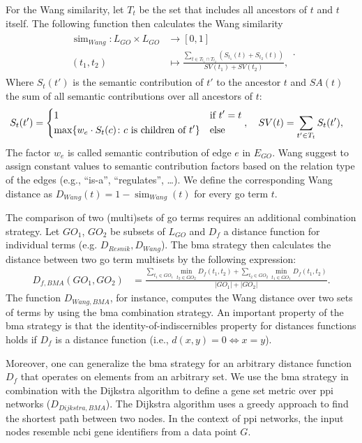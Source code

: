 \documentclass{thesisclass}
\DeclareMathOperator{\simOp}{sim}
\begin{document}
For the Wang similarity, let $T_t$ be the set that includes all ancestors of $t$ and $t$ itself. The following function then calculates the Wang similarity
\begin{align*}
	\begin{split}
		\simOp_{Wang} : L_{GO} \times L_{GO} & \to[0,1]\\
		(t_1, t_2) & \mapsto \frac{\displaystyle \sum_{t\in T_{t_1} \cap T_{t_2}} \left(S_{t_1}(t)+ S_{t_2}(t) \right) }{SV(t_1)+SV(t_2)},
	\end{split}.
\end{align*} 
Where $S_t(t')$ is the semantic contribution of $t'$ to the ancestor $t$ and $SA(t)$ the sum of all semantic contributions over all ancestors of $t$:
\begin{align*}
	S_t(t') & = \begin{dcases}
			1   & \text{if } t' = t \\
			\max \lbrace w_e \cdot S_t(c)\colon c \text{ is children of } t' \rbrace & \text{else}
	\end{dcases}, \quad SV(t) = \sum_{t' \in T_t} S_t(t'),
\end{align*}
The factor $w_e$ is called semantic contribution of edge $e$ in $E_{GO}$. Wang suggest to assign constant values to semantic contribution factors based on the relation type of the edges (e.g., ``is-a'', ``regulates'', \ldots).
We define the corresponding Wang distance as $D_{Wang}(t) = 1- \simOp_{Wang}(t)$ for every \acrfull{go} term $t$.

The comparison of two (multi)sets of \acrshort{go} terms requires an additional combination strategy. 
Let $GO_1$, $GO_2$ be subsets of $ L_{GO}$ and $D_f$ a distance function for individual terms (e.g. $D_{Resnik}, D_{Wang}$). 
The  \acrshort{bma} strategy then calculates the distance between two \acrfull{go} term multisets by the following expression:
\begin{align*}
		D_{f,BMA}(GO_1, GO_2) & =  \frac{\displaystyle \sum_{t_1\in GO_1} \min_{t_2 \in GO_2} D_f(t_1,t_2) +  \sum_{t_2 \in GO_2} \min_{t_1 \in GO_1} D_f(t_1,t_2)}{|GO_1| + |GO_2|}.
\end{align*}
The function $D_{Wang,BMA}$, for instance, computes the Wang distance over two sets of terms by using the \acrshort{bma} combination strategy. An important property of the \acrshort{bma} strategy is that the identity-of-indiscernibles property for distances functions holds if $D_f$ is a distance function (i.e., $d(x,y) = 0 \iff x=y$). 

Moreover, one can generalize the \acrshort{bma} strategy for an arbitrary distance function $D_f$ that operates on elements from an arbitrary set. 
We use the \acrshort{bma} strategy in combination with the Dijkstra algorithm to define a gene set metric over \acrshort{ppi} networks ($D_{Dijkstra,BMA}$). 
The Dijkstra algorithm uses a greedy approach to find the shortest path between two nodes. 
In the context of \acrshort{ppi} networks, the input nodes resemble \acrshort{ncbi} gene identifiers from a data point $G$.
\end{document}
